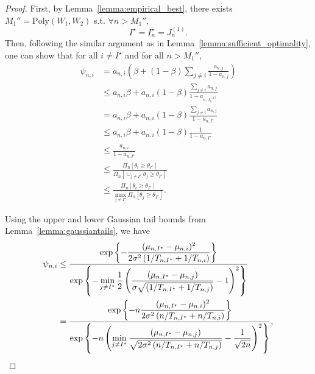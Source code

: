 \begin{proof}
First, by Lemma~\ref{lemma:empirical_best}, there exists $M_1'' = \text{Poly}(W_1,W_2)$ s.t. $\forall n > M_1''$, 
\[
    I^\star = I_n^\star = J_n^{(1)}.
\]
Then, following the similar argument as in Lemma~\ref{lemma:sufficient_optimality}, one can show that for all $i\neq I^\star$ and for all $n > M_1''$,
\begin{align*}
	\psi_{n,i} &=a_{n,i} \left( \beta  + (1-\beta) \sum_{j \neq i} \frac{a_{n,j}}{1-a_{n,j}} \right)\\
	           &\leq a_{n,i} \beta  + a_{n,i} (1-\beta) \frac{\sum_{j \neq i} a_{n,j}}{1-a_{n,J_n^{(1)}}}\\
	           &= a_{n,i} \beta  + a_{n,i} (1-\beta) \frac{\sum_{j \neq i} a_{n,j}}{1-a_{n,I^\star}}\\
	           &\leq a_{n,i}\beta  + a_{n,i} (1-\beta) \frac{1}{1-a_{n,I^\star}}\\
	           &\leq \frac{a_{n,i}}{1-a_{n,I^\star}}\\
	           &\leq \frac{\Pi_{n}\left[ \theta_i\geq\theta_{I^\star} \right]}{\Pi_{n}\left[ \cup_{j\neq I^\star}\theta_j\geq\theta_{I^\star} \right]}\\
	           &\leq \frac{\Pi_{n}\left[ \theta_i\geq\theta_{I^\star} \right]}{\max_{j\neq I^\star} \Pi_{n}\left[ \theta_j\geq\theta_{I^\star} \right]}.
\end{align*}

Using the upper and lower Gaussian tail bounds from Lemma~\ref{lemma:gaussiantails}, we have
\begin{align*}
    \psi_{n,i} &\leq \frac{\displaystyle \exp\left\{- \frac{(\mu_{n,I^\star} - \mu_{n,i})^2}{2\sigma^2\left(1/T_{n,I^\star} + 1/T_{n,i}\right)}\right\}}{\displaystyle \exp\left\{- \min_{j\neq I^\star} \frac{1}{2}\left(\frac{(\mu_{n,I^\star} - \mu_{n,j})}{\sigma\sqrt{\left(1/T_{n,I^\star} + 1/T_{n,j}\right)}} -1\right)^2\right\}}\\ 
               &=  \frac{\displaystyle \exp\left\{- n\frac{(\mu_{n,I^\star} - \mu_{n,i})^2}{2\sigma^2\left(n/T_{n,I^\star} + n/T_{n,i}\right)}\right\}}{\displaystyle \exp\left\{- {n}\left(\min_{j\neq I^\star} \frac{(\mu_{n,I^\star} - \mu_{n,j})}{\sqrt{2\sigma^2\left(n/T_{n,I^\star} + n/T_{n,j}\right)}} -\frac{1}{\sqrt{2n}}\right)^2\right\}},
\end{align*}


\end{proof}
